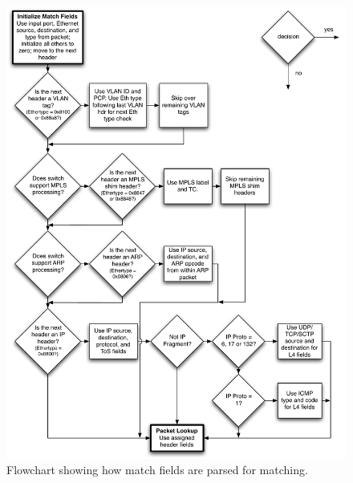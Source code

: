 \documentclass[10pt]{article}
\begin{document}
\begin{figure}[!htb]
\centering
\includegraphics[width=\textwidth]{header_parsing_flowchart}
\caption{Flowchart showing how match fields are parsed for matching.}
\label{fig:header_parsing}
\end{figure}
\end{document}
